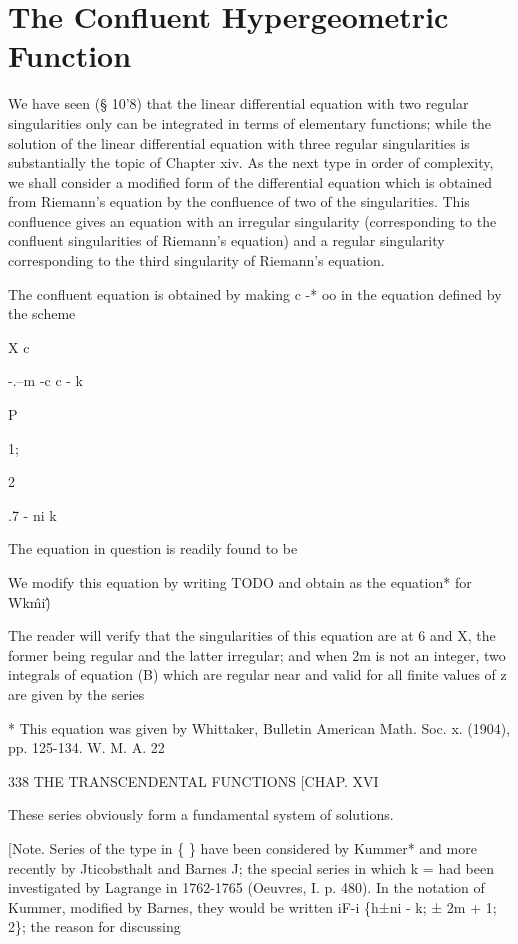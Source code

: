 \chapter{The Confluent Hypergeometric Function}


We have seen (§ 10'8) that the linear differential equation with two
regular singularities only can be integrated in terms of elementary
functions; while the solution of the linear differential equation
with three regular singularities is substantially the topic of Chapter
xiv. As the next type in order of complexity, we shall consider a
modified form of the differential equation which is obtained from
Riemann's equation by the confluence of two of the singularities. This
confluence gives an equation with an irregular singularity
(corresponding to the confluent singularities of Riemann's equation)
and a regular singularity corresponding to the third singularity of
Riemann's equation.

The confluent equation is obtained by making c -* oo in the equation
defined by the scheme

X c

-.--m -c c - k

P

1;

2

.7 - ni k

The equation in question is readily found to be

We modify this equation by writing TODO and obtain as the equation*
for Wk\^mi\^)

The reader will verify that the singularities of this equation are at
6 and X, the former being regular and the latter irregular; and when
2m is not an integer, two integrals of equation (B) which are regular
near and valid for all finite values of z are given by the series

* This equation was given by Whittaker, Bulletin American Math. Soc.
x. (1904), pp. 125-134. W. M. A. 22

338 THE TRANSCENDENTAL FUNCTIONS [CHAP. XVI

These series obviously form a fundamental system of solutions.

[Note. Series of the type in \{ \} have been considered by Kummer* and
more recently by Jticobsthalt and Barnes J; the special series in
which k = had been investigated by Lagrange in 1762-1765 (Oeuvres, I.
p. 480). In the notation of Kummer, modified by Barnes, they would be
written iF-i \{h±ni - k; ± 2m + 1; 2\}; the reason for discussing


